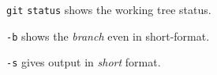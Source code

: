 %

\begin{compactenum}
\item [\texttt{git}] \texttt{status} shows the working tree status.
\item [\texttt{-b}] shows the \emph{branch} even in short-format.
\item [\texttt{-s}] gives output in \emph{short} format.
\end{compactenum}

%